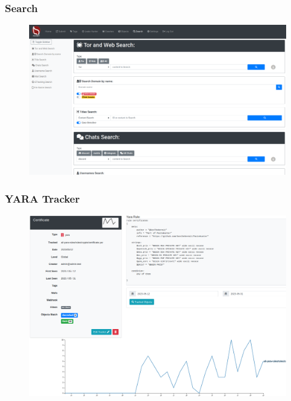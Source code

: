 \documentclass{beamer}
\begin{document}
\begin{frame}
    \frametitle{Search}
    \begin{figure}
        \includegraphics[scale=0.18, angle=0]{screenshot/search.png}
    \end{figure}
\end{frame}

\begin{frame}
    \frametitle{YARA Tracker}
        \begin{figure}
            \includegraphics[scale=0.22]{screenshot/tracker_yara.png}
        \end{figure}
\end{frame}
\end{document}
